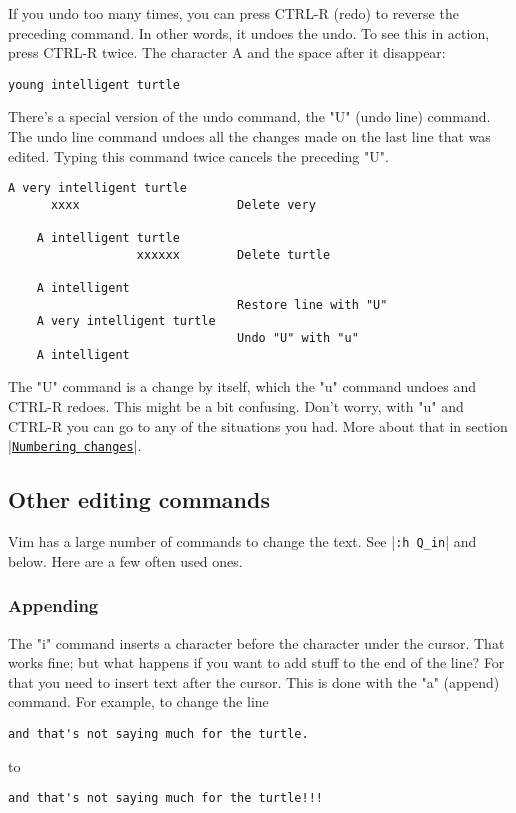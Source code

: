 If you undo too many times, you can press CTRL-R (redo) to reverse the preceding command.
In other words, it undoes the undo.
To see this in action, press CTRL-R twice.
The character A and the space after it disappear: 

		\begin{Verbatim}[samepage=true]
    young intelligent turtle 
		\end{Verbatim}

There's a special version of the undo command, the "U" (undo line) command.
The undo line command undoes all the changes made on the last line that was edited.
Typing this command twice cancels the preceding "U".

		\begin{Verbatim}[samepage=true]
    A very intelligent turtle 
      xxxx                      Delete very

    A intelligent turtle 
                  xxxxxx        Delete turtle

    A intelligent 
                                Restore line with "U"
    A very intelligent turtle 
                                Undo "U" with "u"
    A intelligent 
		\end{Verbatim}

The "U" command is a change by itself, which the "u" command undoes and CTRL-R redoes.
This might be a bit confusing.
Don't worry, with "u" and CTRL-R you can go to any of the situations you had.
More about that in section |\hyperref[Numbering changes]{\texttt{Numbering changes}}|.

\subsection{Other editing commands}

Vim has a large number of commands to change the text.
See |\texttt{:h Q\_in}| and below.
Here are a few often used ones.

\subsubsection{Appending}

The "i" command inserts a character before the character under the cursor.
That works fine; but what happens if you want to add stuff to the end of the line?  For that you need to insert text after the cursor.
This is done with the "a" (append) command.
For example, to change the line 

		\begin{Verbatim}[samepage=true]
    and that's not saying much for the turtle. 
		\end{Verbatim}
to
		\begin{Verbatim}[samepage=true]
    and that's not saying much for the turtle!!! 
		\end{Verbatim}

